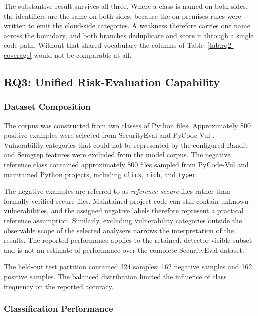 The substantive result survives all three. Where a class is named on both sides,
the identifiers are the same on both sides, because the on-premises rules were
written to emit the cloud-side categories. A weakness therefore carries one name
across the boundary, and both branches deduplicate and score it through a single
code path. Without that shared vocabulary the columns of
Table~\ref{tab:rq2-coverage} would not be comparable at all.

\subsection{RQ3: Unified Risk-Evaluation Capability}
\label{subsec:results-rq3}

\subsubsection{Dataset Composition}
\label{subsubsec:results-dataset}

The corpus was constructed from two classes of Python files. Approximately 800 positive
examples were selected from SecurityEval and PyCode-Vul \cite{siddiq2022seceval, karim2025benchmark}. Vulnerability categories that could not be
represented by the configured Bandit and Semgrep features were excluded from the model
corpus. The negative reference class contained approximately 800 files sampled from PyCode-Vul \cite{karim2025benchmark} and
maintained Python projects, including \texttt{click}, \texttt{rich}, and
\texttt{typer}.

The negative examples are referred to as \emph{reference secure} files rather than
formally verified secure files. Maintained project code can still contain unknown
vulnerabilities, and the assigned negative labels therefore represent a practical
reference assumption. Similarly, excluding vulnerability categories outside the
observable scope of the selected analysers narrows the interpretation of the results.
The reported performance applies to the retained, detector-visible subset and is not an
estimate of performance over the complete SecurityEval dataset.

The held-out test partition contained 324 samples: 162 negative samples and 162 positive
samples. The balanced distribution limited the influence of class frequency on the
reported accuracy.

\subsubsection{Classification Performance}
\label{subsubsec:results-classification}

